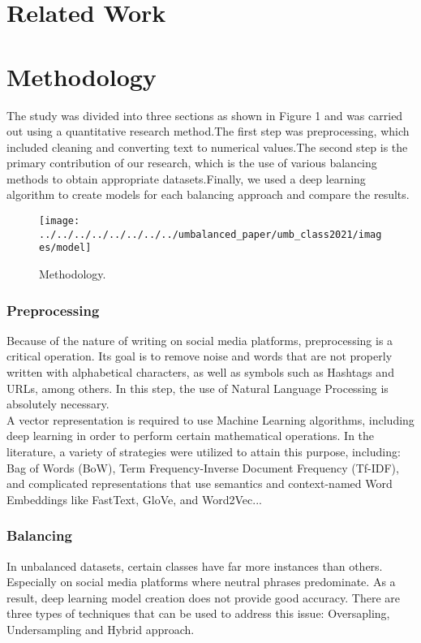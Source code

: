\documentclass[conference]{IEEEtran}
\begin{document}
	
	\section{Related Work}
	\section{Methodology}
	The study was divided into three sections as shown in Figure 1 and was carried out using a quantitative research method.The first step was preprocessing, which included cleaning and converting text to numerical values.The second step is the primary contribution of our research, which is the use of various balancing methods to obtain appropriate datasets.Finally, we used a deep learning algorithm to create models for each balancing approach and compare the results. 
	
	
	\begin{figure}[htbp]
		\centerline{\texttt{[image: ../../../../../../../../umbalanced\_paper/umb\_class2021/images/model]}}
		\caption{Methodology.}
		\label{fig}
	\end{figure}
	
	\subsubsection{Preprocessing}
	Because of the nature of writing on social media platforms, preprocessing is a critical operation. Its goal is to remove noise and words that are not properly written with alphabetical characters, as well as symbols such as Hashtags and URLs, among others. In this step, the use of Natural Language Processing is absolutely necessary. \\
	A vector representation is required to use Machine Learning algorithms, including deep learning in order to perform certain mathematical operations.  In the literature, a variety of strategies were utilized to attain this purpose, including:
	Bag of Words (BoW), Term Frequency-Inverse Document Frequency (Tf-IDF), and complicated representations that use semantics and context-named Word Embeddings like FastText, GloVe, and Word2Vec...
	
	\subsubsection{Balancing}
	In unbalanced datasets, certain classes have far more instances than others. Especially on social media platforms where neutral phrases predominate. As a result, deep learning model creation does not provide good accuracy.  There are three types of techniques that can be used to address this issue: Oversapling, Undersampling and Hybrid approach.\\
	
\end{document}
